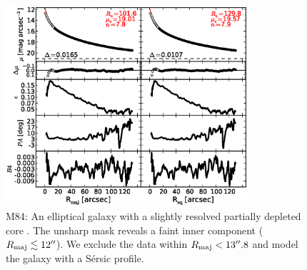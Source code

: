 \documentclass[preprint2]{emulateapj}
\newcommand{\fitfigurewidth}{0.8\textwidth}
\begin{document}
  \begin{figure}[h]
  \begin{center}
  \includegraphics[width=\fitfigurewidth]{m84_1Dfit.eps}
  \caption{M84:
  An elliptical galaxy with a slightly resolved partially depleted core \citep{rusli2013}. %
  The unsharp mask reveals a faint inner component ($R_{\rm maj} \lesssim 12''$). 
  We exclude the data within $R_{\rm maj} < 13''.8$ and model the galaxy with a S\'ersic profile.
  }
  \end{center}
  \end{figure}
\end{document}
